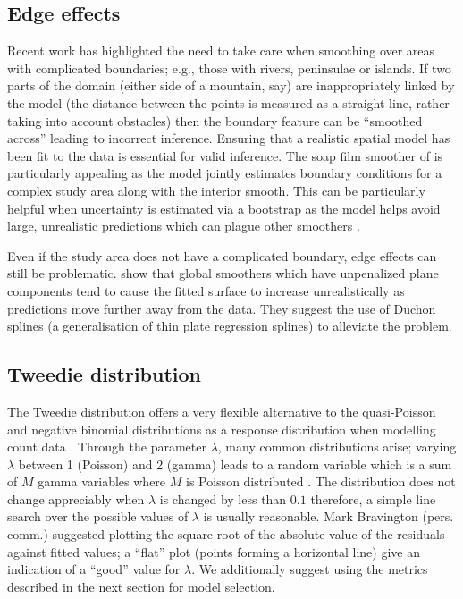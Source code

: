 \documentclass[a4paper,12pt]{article}
\begin{document}
\subsection*{Edge effects}
\label{s:leakage}

Recent work \citep{Ramsay:2002uo,Wang:2007tf,Wood:2008vo,ScottHayward:2011tc,Miller:2012tm} has highlighted the need to take care when smoothing over areas with complicated boundaries; e.g., those with rivers, peninsulae or islands. If two parts of the domain (either side of a mountain, say) are inappropriately linked by the model (the distance between the points is measured as a straight line, rather taking into account obstacles) then the boundary feature can be ``smoothed across'' leading to incorrect inference. Ensuring that a realistic spatial model has been fit to the data is essential for valid inference. The soap film smoother of \cite{Wood:2008vo} is particularly appealing as the model jointly estimates boundary conditions for a complex study area along with the interior smooth. This can be particularly helpful when uncertainty is estimated via a bootstrap as the model helps avoid large, unrealistic predictions which can plague other smoothers \citep{Bravington:2009vo}.

Even if the study area does not have a complicated boundary, edge effects can still be problematic. \cite{Miller:wx} show that global smoothers which have unpenalized plane components tend to cause the fitted surface to increase unrealistically as predictions move further away from the data. They suggest the use of Duchon splines (a generalisation of thin plate regression splines) to alleviate the problem.

\subsection*{Tweedie distribution}
\label{s:Tweedie}

The Tweedie distribution offers a very flexible alternative to the quasi-Poisson and negative binomial distributions as a response distribution when modelling count data \citep{Candy:2004tb}. Through the parameter $\lambda$, many common distributions arise; varying $\lambda$ between 1 (Poisson) and 2 (gamma) leads to a random variable which is a sum of $M$ gamma variables where $M$ is Poisson distributed \citep{Jorgensen:1987vg}. The distribution does not change appreciably when $\lambda$ is changed by less than $0.1$ therefore, a simple line search over the possible values of $\lambda$ is usually reasonable. Mark Bravington (pers. comm.) suggested plotting the square root of the absolute value of the residuals against fitted values; a ``flat'' plot (points forming a horizontal line) give an indication of a ``good'' value for $\lambda$. We additionally suggest using the metrics described in the next section for model selection.
\end{document}
